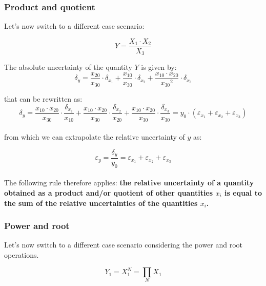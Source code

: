 \documentclass[../main.tex]{subfiles}
\begin{document}
\subsubsection*{Product and quotient}

Let's now switch to a different case scenario:

\begin{equation}
	Y = \frac{X_1 \cdot X_2}{X_3} 
\end{equation}

The absolute uncertainty of the quantity $Y$ is given by:\\

\begin{equation}
	\delta_y = \frac{x_{20}}{x_{30}} \cdot \delta_{x_1} + \frac{x_{10}}{x_{30}} \cdot \delta_{x_2} + \frac{x_{10} \cdot x_{20}}{{x_{30}}^2} \cdot \delta_{x_3}
\end{equation}

that can be rewritten as:\\

\begin{equation}
	\delta_y = \frac{x_{10} \cdot x_{20}}{x_{30}} \cdot \frac{\delta_{x_1}}{x_{10}} + \frac{x_{10} \cdot x_{20}}{x_{30}} \cdot \frac{\delta_{x_2}}{x_{20}} + \frac{x_{10} \cdot x_{20}}{x_{30}} \cdot \frac{\delta_{x_3}}{x_{30}} = y_0 \cdot (\varepsilon_{x_1} + \varepsilon_{x_2} + \varepsilon_{x_3})
\end{equation}\\

from which we can extrapolate the relative uncertainty of $y$ as:

\begin{equation}
	\varepsilon_y = \frac{\delta_y}{y_0} = \varepsilon_{x_1} + \varepsilon_{x_2} + \varepsilon_{x_3}
\end{equation}\\

The following rule therefore applies: \textbf{the relative uncertainty of a quantity obtained as a product and/or quotient of other quantities $x_i$ is equal to the sum of the relative uncertainties of the quantities $x_i$.}

\subsubsection*{Power and root}

Let's now switch to a different case scenario considering the power and root operations.

\begin{equation}
	Y_1 = X_1^N = \prod_N X_1 	
\end{equation}
\end{document}

